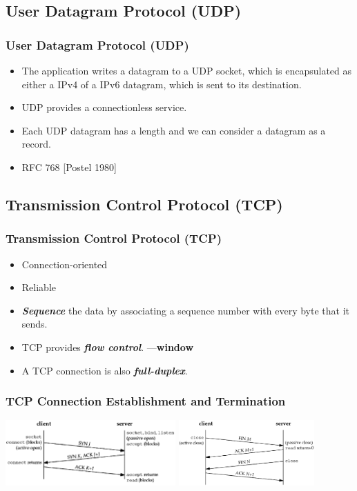 \documentclass[notes,serif]{beamer}
\begin{document}
\subsection{User Datagram Protocol (UDP)}
\begin{frame}
  \frametitle{User Datagram Protocol (UDP)}
  \begin{itemize}
    \item The application writes a datagram to a UDP socket, which is encapsulated as either a IPv4 of a IPv6 datagram, which is sent to its destination.
    \item UDP provides a connectionless service.
    \item Each UDP datagram has a length and we can consider a datagram as a record.
    \item RFC 768 [Postel 1980]
  \end{itemize}
\end{frame}

\subsection{Transmission Control Protocol (TCP)}
\begin{frame}
  \frametitle{Transmission Control Protocol (TCP)}
  \begin{itemize}
    \item Connection-oriented
    \item Reliable
    \item {\bf \em Sequence} the data by associating a sequence number with every byte that it sends.
    \item TCP provides {\bf \em flow control}. ---{\bf window}
    \item A TCP connection is also {\bf \em full-duplex}.
  \end{itemize}
\end{frame}

\begin{frame}
  \frametitle{TCP Connection Establishment and Termination}

  \includegraphics[height=2.5cm]{figs/02fig02.png}
  \includegraphics[height=2.5cm]{figs/02fig03.png}
\end{frame}
\end{document}
